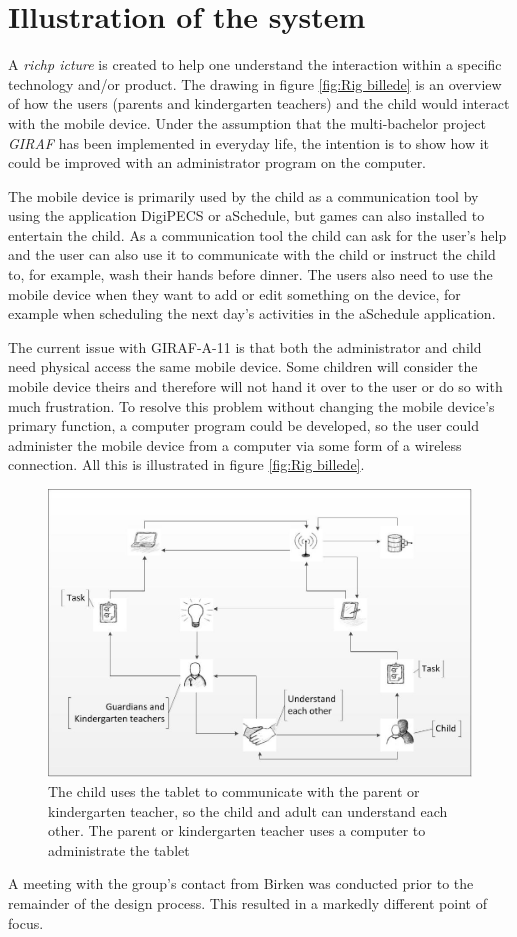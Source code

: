 \section{Illustration of the system}
A \emph{richp icture} is created to help one understand the interaction within a specific technology and/or product\cite{OOAD}. The drawing in figure \vref{fig:Rig billede} is an overview of how the users (parents and kindergarten teachers) and the child would interact with the mobile device. Under the assumption that the multi-bachelor project \emph{GIRAF} has been implemented in everyday life, the intention is to show how it could be improved with an administrator program on the computer.

The mobile device is primarily used by the child as a communication tool by using the application DigiPECS or aSchedule, but games can also installed to entertain the child. As a communication tool the child can ask for the user's help and the user can also use it to communicate with the child or instruct the child to, for example, wash their hands before dinner.
The users also need to use the mobile device when they want to add or edit something on the device, for example when scheduling the next day's activities in the aSchedule application.
 
The current issue with GIRAF-A-11 is that both the administrator and child need physical access the same mobile device. Some children will consider the mobile device theirs and therefore will not hand it over to the user or do so with much frustration. To resolve this problem without changing the mobile device's primary function, a computer program could be developed, so the user could administer the mobile device from a computer via some form of a wireless connection. All this is illustrated in figure \vref{fig:Rig billede}. 

\begin{figure}[!ht]
	\centering
		\includegraphics[width=1.00\textwidth]{img/Rig_billede2.jpg}
	\caption{The child uses the tablet to communicate with the parent or kindergarten teacher, so the child and adult can understand each other. The parent or kindergarten teacher uses a computer to administrate the tablet}
	\label{fig:Rig billede}
\end{figure}
\newpage

A meeting with the group's contact from Birken was conducted prior to the remainder of the design process. This resulted in a markedly different point of focus.
    